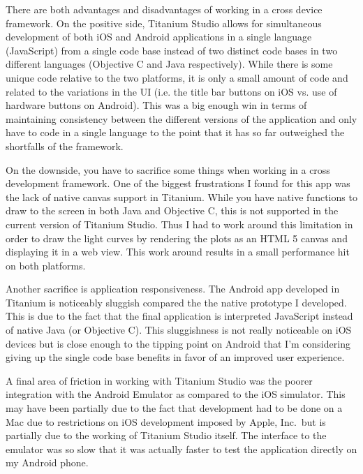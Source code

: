 There are both advantages and disadvantages of working in a cross device framework.  On the positive side, Titanium Studio allows for simultaneous development of both iOS and Android applications in a single language (JavaScript) from a single code base instead of two distinct code bases in two different languages (Objective C and Java respectively).  While there is some unique code relative to the two platforms, it is only a small amount of code and related to the variations in the UI (i.e. the title bar buttons on iOS vs. use of hardware buttons on Android).  This was a big enough win in terms of maintaining consistency between the different versions of the application and only have to code in a single language to the point that it has so far outweighed the shortfalls of the framework.

On the downside, you have to sacrifice some things when working in a cross development framework.  One of the biggest frustrations I found for this app was the lack of native canvas support in Titanium.  While you have native functions to draw to the screen in both Java and Objective C, this is not supported in the current version of Titanium Studio.  Thus I had to work around this limitation in order to draw the light curves by rendering the plots as an HTML 5 canvas and displaying it in a web view.  This work around results in a small performance hit on both platforms.

Another sacrifice is application responsiveness.  The Android app developed in Titanium is noticeably sluggish compared the the native prototype I developed.  This is due to the fact that the final application is interpreted JavaScript instead of native Java (or Objective C).  This sluggishness is not really noticeable on iOS devices but is close enough to the tipping point on Android that I'm considering giving up the single code base benefits in favor of an improved user experience.

A final area of friction in working with Titanium Studio was the poorer integration with the Android Emulator as compared to the iOS simulator.  This may have been partially due to the fact that development had to be done on a Mac due to restrictions on iOS development imposed by Apple, Inc.\ but is partially due to the working of Titanium Studio itself.  The interface to the emulator was so slow that it was actually faster to test the application directly on my Android phone.

